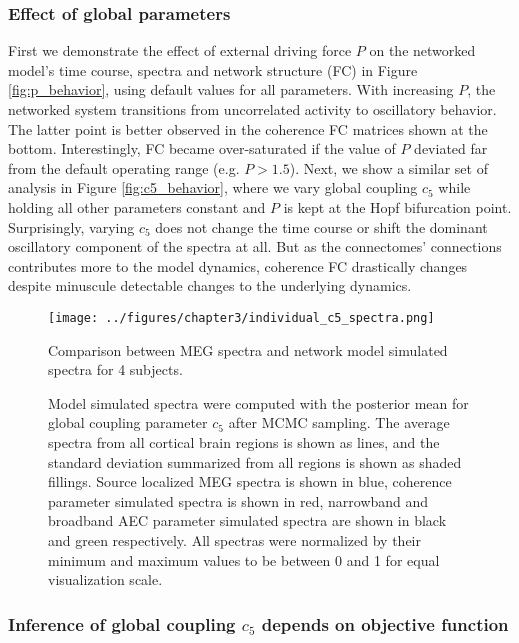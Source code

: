 \subsubsection{Effect of global parameters}
First we demonstrate the effect of external driving force $P$ on the networked model's time course, spectra and network structure (FC) in Figure \ref{fig:p_behavior}, using default values for all parameters. With increasing $P$, the networked system transitions from uncorrelated activity to oscillatory behavior. The latter point is better observed in the coherence FC matrices shown at the bottom. Interestingly, FC became over-saturated if the value of $P$ deviated far from the default operating range (e.g. $P>1.5$). Next, we show a similar set of analysis in Figure \ref{fig:c5_behavior}, where we vary global coupling $c_5$ while holding all other parameters constant and $P$ is kept at the Hopf bifurcation point. Surprisingly, varying $c_5$ does not change the time course or shift the dominant oscillatory component of the spectra at all. But as the connectomes' connections contributes more to the model dynamics, coherence FC drastically changes despite minuscule detectable changes to the underlying dynamics.

\begin{figure}[htbp]
    \centering
    \captionsetup{justification=centerlast}
    \texttt{[image: ../figures/chapter3/individual\_c5\_spectra.png]}
    \caption{Comparison between MEG spectra and network model simulated spectra for 4 subjects.}
    \caption*{Model simulated spectra were computed with the posterior mean for global coupling parameter $c_5$ after MCMC sampling. The average spectra from all cortical brain regions is shown as lines, and the standard deviation summarized from all regions is shown as shaded fillings. Source localized MEG spectra is shown in blue, coherence parameter simulated spectra is shown in red, narrowband and broadband AEC parameter simulated spectra are shown in black and green respectively. All spectras were normalized by their minimum and maximum values to be between 0 and 1 for equal visualization scale.}
    \label{fig:c5_spectra}
\end{figure}

\subsubsection{Inference of global coupling $c_5$ depends on objective function}

